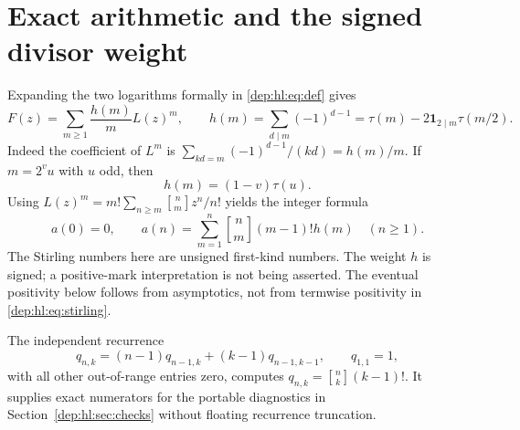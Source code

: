 \documentclass[11pt]{article}
\theoremstyle{definition}\newtheorem{definition}[theorem]{Definition}
\theoremstyle{remark}\newtheorem{remark}[theorem]{Remark}
\newcommand{\stir}[2]{\genfrac{[}{]}{0pt}{}{#1}{#2}}
\begin{document}
\section{Exact arithmetic and the signed divisor weight}\label{dep:hl:sec:exact}
Expanding the two logarithms formally in \eqref{dep:hl:eq:def} gives
\begin{equation}\label{dep:hl:eq:h}
 F(z)=\sum_{m\ge1}\frac{h(m)}mL(z)^m,\qquad
 h(m)=\sum_{d\mid m}(-1)^{d-1}
     =\tau(m)-2\mathbf1_{2\mid m}\tau(m/2).
\end{equation}
Indeed the coefficient of $L^m$ is
$\sum_{kd=m}(-1)^{d-1}/(kd)=h(m)/m$.
If $m=2^v u$ with $u$ odd, then
\begin{equation}\label{dep:hl:eq:odd}
 h(m)=(1-v)\tau(u).
\end{equation}
Using $L(z)^m=m!\sum_{n\ge m}\stir nm z^n/n!$ yields the integer formula
\begin{equation}\label{dep:hl:eq:stirling}
 a(0)=0,\qquad
 a(n)=\sum_{m=1}^n\stir nm(m-1)!h(m)\quad(n\ge1).
\end{equation}
The Stirling numbers here are unsigned first-kind numbers. The weight
$h$ is signed; a positive-mark interpretation is not being asserted.
The eventual positivity below follows from asymptotics, not from
termwise positivity in \eqref{dep:hl:eq:stirling}.

The independent recurrence
\[
 q_{n,k}=(n-1)q_{n-1,k}+(k-1)q_{n-1,k-1},\qquad q_{1,1}=1,
\]
with all other out-of-range entries zero, computes
$q_{n,k}=\stir nk(k-1)!$. It supplies exact numerators for the portable
diagnostics in Section~\ref{dep:hl:sec:checks} without floating recurrence
truncation.
\end{document}
